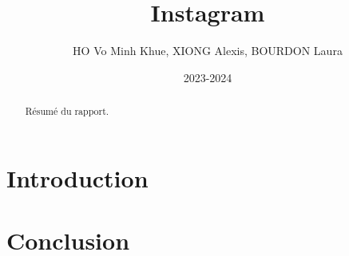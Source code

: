 \documentclass[a4paper,12pt]{article}
\title{Instagram}
\author{HO Vo Minh Khue, XIONG Alexis, BOURDON Laura}
\date{2023-2024}
\begin{document}
\maketitle

\begin{abstract}
  Résumé du rapport.
\end{abstract}


\section{Introduction}




\section{Conclusion}




\end{document}
